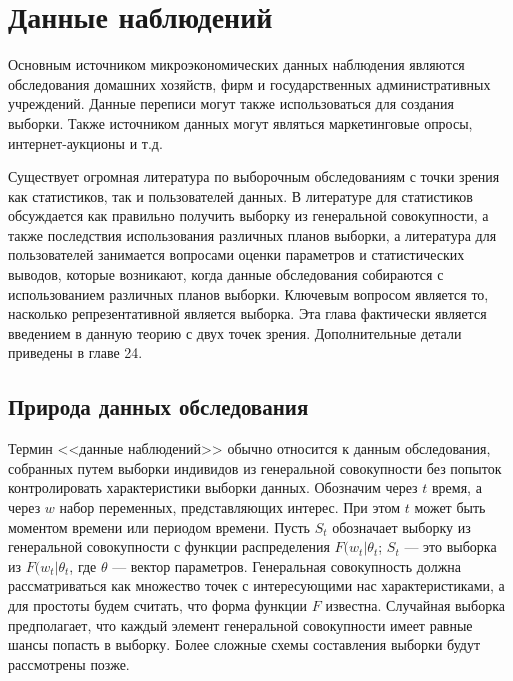 \section{Данные наблюдений}

	
Основным источником микроэкономических данных наблюдения являются обследования домашних хозяйств, фирм и государственных административных учреждений. Данные переписи могут также использоваться для создания выборки. Также  источником данных могут являться маркетинговые опросы, интернет-аукционы и т.д. 

Существует огромная литература по выборочным обследованиям с точки зрения как статистиков, так и пользователей данных. В литературе для статистиков обсуждается как правильно получить выборку из генеральной совокупности, а также последствия использования различных планов выборки, а литература для пользователей занимается вопросами оценки параметров и статистических выводов, которые возникают, когда данные обследования собираются с использованием различных планов выборки. Ключевым вопросом является то, насколько репрезентативной является выборка. Эта глава фактически является введением в данную теорию с двух точек зрения. Дополнительные детали  приведены в главе 24.
	

\subsection{Природа данных обследования}


Термин <<данные наблюдений>> обычно относится к данным обследования, собранных путем выборки  индивидов из  генеральной совокупности без попыток контролировать характеристики выборки данных.
Обозначим через $t$ время, а через $w$  набор переменных, представляющих интерес. При этом  $t$ может быть моментом времени или периодом времени. Пусть $S_{t}$ обозначает выборку из генеральной совокупности с  функции распределения  $F(w_{t}|\theta_{t}$; $S_{t}$ --- это выборка из $F(w_{t}|\theta_{t}$, где $\theta$ --- вектор параметров. Генеральная совокупность должна рассматриваться как множество точек с интересующими нас характеристиками, а для простоты будем считать, что форма функции $F$ известна. Случайная выборка предполагает, что каждый элемент генеральной совокупности имеет равные шансы попасть в выборку. Более сложные схемы составления выборки будут рассмотрены позже.


